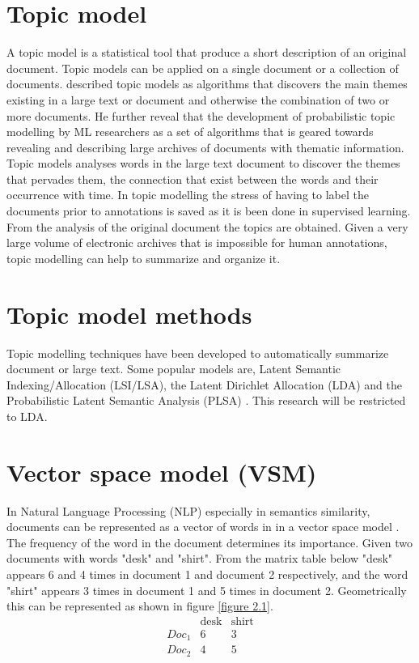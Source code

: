 \section{Topic model}  
A topic model is a statistical tool that produce a short description of an original document. Topic models can be applied on a single document or a collection of documents. \citep{blei2012surveying} described topic models as algorithms that discovers the main themes existing in a large text or document and otherwise the combination of two or more documents. He further reveal that the development of probabilistic topic modelling by ML  researchers as a set of algorithms that is geared towards revealing and describing large archives of documents with thematic information. Topic models analyses words in the large text document to discover the themes that pervades them, the connection that exist between the words and their occurrence with time. In topic modelling the stress of having to label the documents prior to annotations is saved as it is been done in supervised learning. From the analysis of the original document the topics are obtained. Given a very large volume of electronic archives that is impossible for human annotations, topic modelling can help to summarize and organize it.
\section{Topic model methods}
Topic modelling techniques have been developed to automatically summarize document or large text. Some popular models are, Latent Semantic Indexing/Allocation  (LSI/LSA), the Latent Dirichlet Allocation (LDA) and the Probabilistic Latent Semantic Analysis (PLSA) . This research will be restricted to LDA.
\section{Vector space model (VSM)}

In Natural Language Processing (NLP) especially in semantics similarity, documents can be represented as a vector of words in in a vector space model \cite{salton1975vector}. The frequency of the word in the document determines its importance. Given two documents with words  "desk" and "shirt". From the matrix table below "desk" appears 6 and 4 times in document 1 and document 2 respectively, and the word "shirt" appears 3 times in document 1 and 5 times in document 2. Geometrically this can be represented as shown in figure \ref{figure 2.1}.
$$\begin{array}{cccc}
 &\text{desk} & \text{shirt} \\ 
 Doc_1 & 6 & 3\\ 
 Doc_2 & 4 & 5
\end{array} $$

